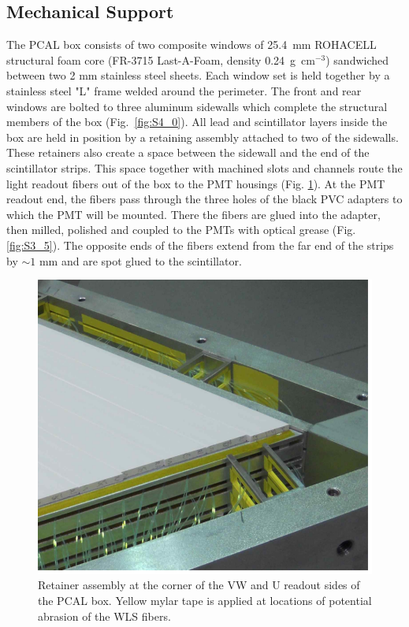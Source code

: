 \subsection{Mechanical Support}
The PCAL box consists of two composite windows of 25.4~mm ROHACELL structural foam core (FR-3715 Last-A-Foam, density 0.24~g~cm$^{-3}$) sandwiched between two 2 mm stainless steel sheets.  Each window set is held together by a stainless steel "L" frame welded around the perimeter.  The front and rear windows are bolted to three aluminum sidewalls which complete the structural members of the box (Fig.~\ref{fig:S4_0}).  All lead and scintillator layers inside the box are held in position by a retaining assembly attached to two of the sidewalls.  These retainers also create a space between the sidewall and the end of the scintillator strips.  This space together with machined slots and channels route the light readout fibers out of the box to the PMT housings (Fig. \ref{fig:S3_6}).  At the PMT readout end, the fibers pass through the three holes of the black PVC adapters to which the PMT will be mounted.  There the fibers are glued into the adapter, then milled, polished and coupled to the PMTs with optical grease (Fig. \ref{fig:S3_5}). The opposite ends of the fibers extend from the far end of the strips by $\sim 1$ mm and are spot glued to the scintillator.  

\begin{figure}[hbt]
\centering
\includegraphics[width=0.95\columnwidth,keepaspectratio]{img/S3_6.png}
\caption[PCAL UVW Layers]{Retainer assembly at the corner of the VW and U readout sides of the PCAL box. Yellow mylar tape is applied at locations of potential abrasion of the WLS fibers.}
\label{fig:S3_6}
\end{figure}

